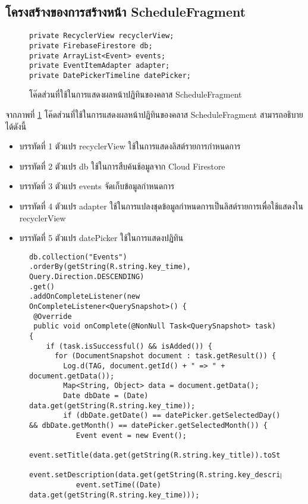 {	\subsection{โครงสร้างของการสร้างหน้า ScheduleFragment}
	\begin{figure}[H]
		{\begin{lstlisting}
private RecyclerView recyclerView;
private FirebaseFirestore db;
private ArrayList<Event> events;
private EventItemAdapter adapter;
private DatePickerTimeline datePicker;
			\end{lstlisting}}
		\caption{โค๊ดส่วนที่ใช้ในการแสดงผลหน้าปฏิทินของคลาส ScheduleFragment}
		\label{Fig:ScheduleFragment}
	\end{figure}
	จากภาพที่ \ref{Fig:ScheduleFragment} โค๊ดส่วนที่ใช้ในการแสดงผลหน้าปฏิทินของคลาส ScheduleFragment สามารถอธิบายได้ดังนี้
	\begin{itemize}[label={--}]
		\item บรรทัดที่ 1 ตัวแปร recyclerView ใช้ในการแสดงลิสต์รายการกำหนดการ
	    \item บรรทัดที่ 2 ตัวแปร db ใช้ในการสืบค้นช้อมูลจาก Cloud Firestore
		\item บรรทัดที่ 3 ตัวแปร events จัดเก็บข้อมูลกำหนดการ
		\item บรรทัดที่ 4 ตัวแปร adapter ใช้ในการแปลงชุดข้อมูลกำหนดการเป็นลิสต์รายการเพื่อใช้แสดงใน recyclerView
		\item บรรทัดที่ 5 ตัวแปร datePicker ใช้ในการแสดงปฏิทิน   
	\end{itemize}
	\begin{figure}[H]
		{\begin{lstlisting}
db.collection("Events")
.orderBy(getString(R.string.key_time), Query.Direction.DESCENDING)
.get()
.addOnCompleteListener(new OnCompleteListener<QuerySnapshot>() {
 @Override
 public void onComplete(@NonNull Task<QuerySnapshot> task) {
    if (task.isSuccessful() && isAdded()) {
      for (DocumentSnapshot document : task.getResult()) {
        Log.d(TAG, document.getId() + " => " + document.getData());
        Map<String, Object> data = document.getData();
        Date dbDate = (Date) data.get(getString(R.string.key_time));
        if (dbDate.getDate() == datePicker.getSelectedDay() && dbDate.getMonth() == datePicker.getSelectedMonth()) {
           Event event = new Event();
           event.setTitle(data.get(getString(R.string.key_title)).toString());
           event.setDescription(data.get(getString(R.string.key_description)).toString());
           event.setTime((Date) data.get(getString(R.string.key_time)));

\end{lstlisting}}
\end{figure}}
